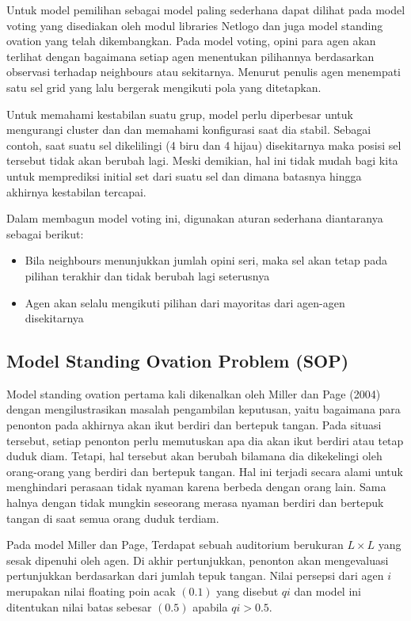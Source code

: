 Untuk model pemilihan sebagai model paling sederhana dapat dilihat pada model voting yang disediakan oleh modul libraries Netlogo dan juga model standing ovation yang telah dikembangkan. Pada model voting, opini para agen akan terlihat dengan bagaimana setiap agen menentukan pilihannya berdasarkan observasi terhadap neighbours atau sekitarnya. Menurut penulis \cite{viridi2019agent} agen menempati satu sel grid yang lalu bergerak mengikuti pola yang ditetapkan.

Untuk memahami kestabilan suatu grup, model perlu diperbesar untuk mengurangi cluster dan  dan memahami konfigurasi saat dia stabil. Sebagai contoh, saat suatu sel dikelilingi (4 biru dan 4 hijau) disekitarnya maka posisi sel tersebut tidak akan berubah lagi. Meski demikian, hal ini tidak mudah bagi kita untuk memprediksi initial set dari suatu sel dan dimana batasnya hingga akhirnya kestabilan tercapai.

Dalam membagun model voting ini, digunakan aturan sederhana diantaranya sebagai berikut:

\begin{itemize}
	\item Bila neighbours menunjukkan jumlah opini seri, maka sel akan tetap pada pilihan terakhir dan tidak berubah lagi seterusnya

	\item Agen akan selalu mengikuti pilihan dari mayoritas dari agen-agen disekitarnya
\end{itemize}

\subsection{Model Standing Ovation Problem (SOP)}

Model standing ovation pertama kali dikenalkan oleh Miller dan Page (2004) dengan mengilustrasikan masalah pengambilan keputusan, yaitu bagaimana para penonton pada akhirnya akan ikut berdiri dan bertepuk tangan. Pada situasi tersebut, setiap penonton perlu memutuskan apa dia akan ikut berdiri atau tetap duduk diam. Tetapi, hal tersebut akan berubah bilamana dia dikekelingi oleh orang-orang yang berdiri dan bertepuk tangan. Hal ini terjadi secara alami untuk menghindari perasaan tidak nyaman karena berbeda dengan orang lain. Sama halnya dengan tidak mungkin seseorang merasa nyaman berdiri dan bertepuk tangan di saat semua orang duduk terdiam.

Pada model Miller dan Page, Terdapat sebuah auditorium berukuran $L \times L$ yang sesak dipenuhi oleh agen. Di akhir pertunjukkan, penonton akan mengevaluasi pertunjukkan berdasarkan dari jumlah tepuk tangan. Nilai persepsi dari agen $i$ merupakan nilai floating poin acak $\left( 0.1 \right) $ yang disebut $qi$ dan model ini ditentukan nilai batas sebesar $\left( 0.5 \right)$ apabila $qi > 0.5$.

